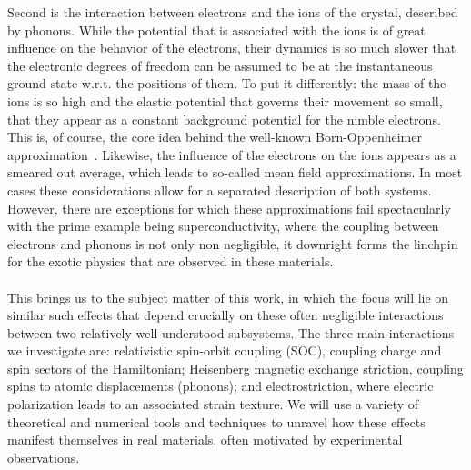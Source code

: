 Second is the interaction between electrons and the ions of the crystal, described by phonons.
While the potential that is associated with the ions is of great influence on the behavior of the electrons, their dynamics is so much slower that the electronic degrees of freedom can be assumed to be at the instantaneous ground state w.r.t. the positions of them.
To put it differently: the mass of the ions is so high and the elastic potential that governs their movement so small, that they appear as a constant background potential for the nimble electrons.
This is, of course, the core idea behind the well-known Born-Oppenheimer approximation~\cite{Born1927}.
Likewise, the influence of the electrons on the ions appears as a smeared out average, which leads to so-called mean field approximations.
In most cases these considerations allow for a separated description of both systems.
However, there are exceptions for which these approximations fail spectacularly with the prime example being superconductivity, where the coupling between electrons and phonons is not only non negligible, it downright forms the linchpin for the exotic physics that are observed in these materials.
\\\\
This brings us to the subject matter of this work, in which the focus will lie on similar such effects that depend crucially on these often negligible interactions between two relatively well-understood subsystems.
The three main interactions we investigate are: relativistic spin-orbit coupling (SOC), coupling charge and spin sectors of the Hamiltonian; Heisenberg magnetic exchange striction, coupling spins to atomic displacements (phonons); and electrostriction, where electric polarization leads to an associated strain texture.
We will use a variety of theoretical and numerical tools and techniques to unravel how these effects manifest themselves in real materials, often motivated by experimental observations.

